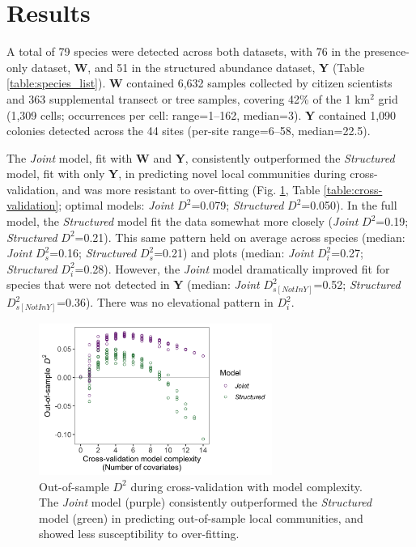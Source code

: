 \documentclass[preprint,final,times,12pt,3p]{elsarticle}
\begin{document}
\section{Results}
\label{S:3}
A total of 79 species were detected across both datasets, with 76 in the presence-only dataset, \textbf{W}, and 51 in the structured abundance dataset, \textbf{Y} (Table \ref{table:species_list}). \textbf{W} contained 6,632 samples collected by citizen scientists and 363 supplemental transect or tree samples, covering 42\% of the 1 km$^2$ grid (1,309 cells; occurrences per cell: range=1–162, median=3). \textbf{Y} contained 1,090 colonies detected across the 44 sites (per-site range=6–58, median=22.5). 

The \emph{Joint} model, fit with \textbf{W} and \textbf{Y}, consistently outperformed the \emph{Structured} model, fit with only \textbf{Y}, in predicting novel local communities during cross-validation, and was more resistant to over-fitting (Fig. \ref{fig:cross-validation}, Table \ref{table:cross-validation}; optimal models: \emph{Joint} $D^2$=0.079; \emph{Structured} $D^2$=0.050). In the full model, the \emph{Structured} model fit the data somewhat more closely (\emph{Joint} $D^2$=0.19; \emph{Structured} $D^2$=0.21). This same pattern held on average across species (median: \emph{Joint} $D^2_s$=0.16; \emph{Structured} $D^2_s$=0.21) and plots (median: \emph{Joint} $D^2_i$=0.27; \emph{Structured} $D^2_i$=0.28). However, the \emph{Joint} model dramatically improved fit for species that were not detected in \textbf{Y} (median: \emph{Joint} $D^2_{s[Not In Y]}$=0.52; \emph{Structured} $D^2_{s[Not In Y]}$=0.36). There was no elevational pattern in $D^2_i$.

\begin{figure}
	\centering\includegraphics[width=3in]{../../../ms/1_Ecography/1/figs/crossvalidation.png}
	\caption{\label{fig:cross-validation} Out-of-sample $D^2$ during cross-validation with model complexity. The \emph{Joint} model (purple) consistently outperformed the \emph{Structured} model (green) in predicting out-of-sample local communities, and showed less susceptibility to over-fitting.  }
\end{figure}
\end{document}
